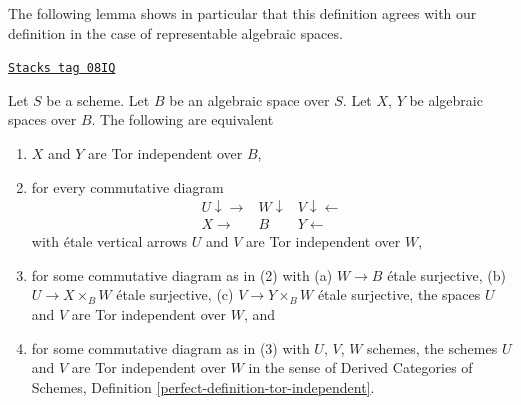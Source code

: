 The following lemma shows in particular that this definition agrees
with our definition in the case of representable algebraic spaces.

\begin{lemma}
\label{spaces-perfect-lemma-tor-independent}
\href{https://stacks.math.columbia.edu/tag/08IQ}{\texttt{Stacks tag 08IQ}}

Let $S$ be a scheme. Let $B$ be an algebraic space over $S$.
Let $X$, $Y$ be algebraic spaces over $B$. The following are equivalent
\begin{enumerate}
\item $X$ and $Y$ are Tor independent over $B$,
\item for every commutative diagram
$$
\begin{array}{ccc}U \downarrow\longrightarrow & W \downarrow & V \downarrow\longleftarrow \\ X \longrightarrow & B & Y \longleftarrow\end{array}
$$
with \'etale vertical arrows $U$ and $V$ are Tor independent over $W$,
\item for some commutative diagram as in (2) with (a) $W \to B$ \'etale
surjective, (b) $U \to X \times_B W$ \'etale surjective, (c)
$V \to Y \times_B W$ \'etale surjective, the spaces $U$ and $V$ are Tor
independent over $W$, and
\item for some commutative diagram as in (3) with $U$, $V$, $W$ schemes,
the schemes $U$ and $V$ are Tor independent over $W$ in the sense of
Derived Categories of Schemes, Definition
\ref{perfect-definition-tor-independent}.
\end{enumerate}
\end{lemma}

